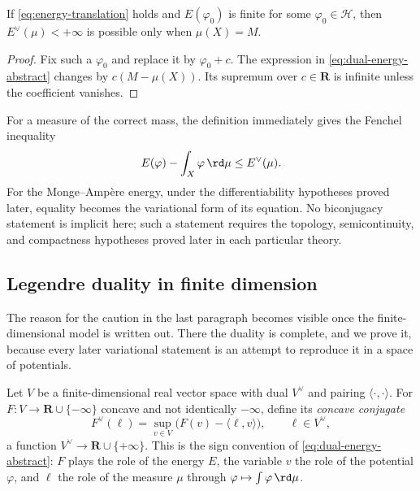 \begin{lemma}\label{lem:dual-mass}
If \eqref{eq:energy-translation} holds and $E(\varphi_0)$ is finite for some
$\varphi_0\in\mathcal H$, then $E^\vee(\mu)<+\infty$ is possible only when
$\mu(X)=M$.
\end{lemma}

\begin{proof}
Fix such a $\varphi_0$ and replace it by $\varphi_0+c$.  The expression in
\eqref{eq:dual-energy-abstract} changes by
$c(M-\mu(X))$.  Its supremum over $c\in\mathbf R$ is infinite unless the
coefficient vanishes.
\end{proof}

For a measure of the correct mass, the definition immediately gives the
Fenchel inequality
\begin{equation}
\label{eq:fenchel-energy}
                E(\varphi)-\int_X\varphi\,\rd \mu\leq E^\vee(\mu).
\end{equation}
For the Monge--Amp\`ere energy, under the differentiability hypotheses
proved later, equality becomes the variational form of its equation.  No
biconjugacy statement is implicit here; such a statement requires the
topology, semicontinuity, and compactness hypotheses proved later in each
particular theory.

\subsection{Legendre duality in finite dimension}
\label{subsec:legendre-finite}

The reason for the caution in the last paragraph becomes visible once the
finite-dimensional model is written out.  There the duality is complete, and
we prove it, because every later variational statement is an attempt to
reproduce it in a space of potentials.

Let $V$ be a finite-dimensional real vector space with dual $V^\vee$ and
pairing $\langle\cdot,\cdot\rangle$.  For
$F:V\to\mathbf R\cup\{-\infty\}$ concave and not identically $-\infty$,
define its \emph{concave conjugate}
\begin{equation}
\label{eq:concave-conjugate}
 F^\vee(\ell)=\sup_{v\in V}\bigl(F(v)-\langle\ell,v\rangle\bigr),
 \qquad \ell\in V^\vee ,
\end{equation}
a function $V^\vee\to\mathbf R\cup\{+\infty\}$.  This is the sign convention
of \eqref{eq:dual-energy-abstract}: $F$ plays the role of the energy $E$, the
variable $v$ the role of the potential $\varphi$, and $\ell$ the role of the
measure $\mu$ through $\varphi\mapsto\int\varphi\,\rd\mu$.

